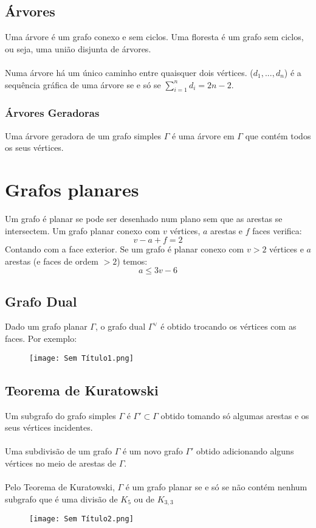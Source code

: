 \documentclass[10pt,a4paper]{report}
\begin{document}
\subsection{Árvores}
Uma árvore é um grafo conexo e sem ciclos. Uma floresta é um grafo sem ciclos, ou seja, uma união disjunta de árvores.\\
\\
Numa árvore há um único caminho entre quaisquer dois vértices. ($d_1, ..., d_n$) é a sequência gráfica de uma árvore se e só se $\sum_{i=1}^n d_i = 2n-2$.
\subsubsection{Árvores Geradoras}
Uma árvore geradora de um grafo simples $\Gamma$ é uma árvore em $\Gamma$ que contém todos os seus vértices.
\section{Grafos planares}
Um grafo é planar se pode ser desenhado num plano sem que as arestas se intersectem. Um grafo planar conexo com $v$ vértices, $a$ arestas e $f$ faces verifica:
$$
v - a + f = 2
$$
Contando com a face exterior. Se um grafo é planar conexo com $v > 2$ vértices e $a$ arestas (e faces de ordem $> 2$) temos:
$$
a \leq 3v - 6
$$
\subsection{Grafo Dual}
Dado um grafo planar $\Gamma$, o grafo dual $\Gamma^\lor$ é obtido trocando os vértices com as faces. Por exemplo:
\begin{figure}[H]
\centering
\texttt{[image: Sem Título1.png]}
\end{figure}
\subsection{Teorema de Kuratowski}
Um subgrafo do grafo simples $\Gamma$ é $\Gamma' \subset \Gamma$ obtido tomando só algumas arestas e os seus vértices incidentes.\\
\\
Uma subdivisão de um grafo $\Gamma$ é um novo grafo $\Gamma'$ obtido adicionando alguns vértices no meio de arestas de $\Gamma$.\\
\\
Pelo Teorema de Kuratowski, $\Gamma$ é um grafo planar se e só se não contém nenhum subgrafo que é uma divisão de $K_5$ ou de $K_{3,3}$
\begin{figure}[H]
\centering
\texttt{[image: Sem Título2.png]}
\end{figure}
\end{document}
